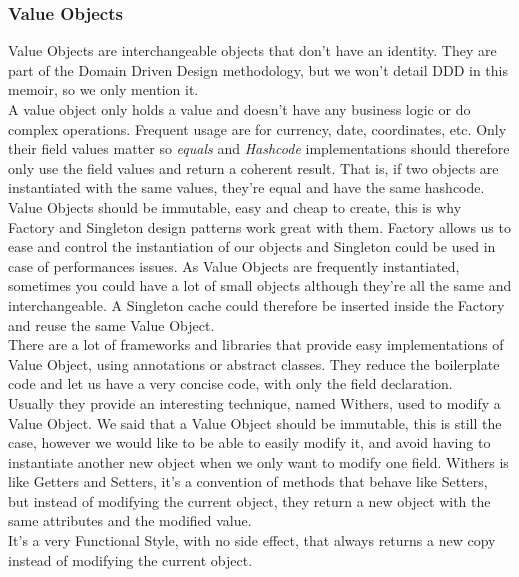 \subsubsection{Value Objects}
Value Objects are interchangeable objects that don't have an identity.
They are part of the Domain Driven Design methodology, but we won't
detail DDD in this memoir, so we only mention it. \\
\newline
A value object only holds a value and doesn't have any business logic
or do complex operations.
Frequent usage are for currency, date, coordinates, etc.
Only their field values matter so \textit{equals} and \textit{Hashcode}
implementations should therefore only use the field values and return
a coherent result.
That is, if two objects are instantiated with the same values, they're
equal and have the same hashcode. \\
\newline
Value Objects should be immutable, easy and cheap to create, this is why
Factory and Singleton design patterns work great with them.
Factory allows us to ease and control the instantiation of our objects
and Singleton could be used in case of performances issues.
As Value Objects are frequently instantiated, sometimes you could have
a lot of small objects although they're all the same and interchangeable.
A Singleton cache could therefore be inserted inside the Factory and
reuse the same Value Object. \\
\newline
There are a lot of frameworks and libraries that provide easy
implementations of Value Object, using annotations or abstract classes.
They reduce the boilerplate code and let us have a very concise code,
with only the field declaration. \\
Usually they provide an interesting technique, named Withers, used to
modify a Value Object.
We said that a Value Object should be immutable, this is still the case,
however we would like to be able to easily modify it, and avoid having
to instantiate another new object when we only want to modify one field.
Withers is like Getters and Setters, it's a convention of methods that
behave like Setters, but instead of modifying the current object,
they return a new object with the same attributes and the modified
value. \\
It's a very Functional Style, with no side effect, that always returns
a new copy instead of modifying the current object.

